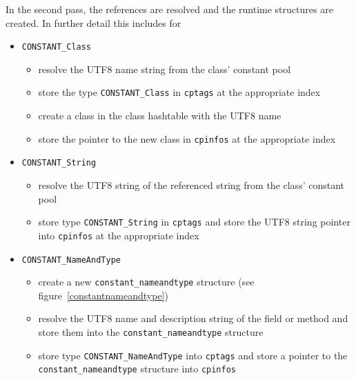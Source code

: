 In the second pass, the references are resolved and the runtime
structures are created. In further detail this includes for

\begin{itemize}

 \item \texttt{CONSTANT\_Class}

  \begin{itemize}

   \item resolve the UTF8 name string from the class' constant pool

   \item store the type \texttt{CONSTANT\_Class} in \texttt{cptags} at
   the appropriate index

   \item create a class in the class hashtable with the UTF8 name

   \item store the pointer to the new class in \texttt{cpinfos} at the
   appropriate index

  \end{itemize}

 \item \texttt{CONSTANT\_String}

  \begin{itemize}

   \item resolve the UTF8 string of the referenced string from the
   class' constant pool

   \item store type \texttt{CONSTANT\_String} in \texttt{cptags} and
   store the UTF8 string pointer into \texttt{cpinfos} at the
   appropriate index

  \end{itemize}

 \item \texttt{CONSTANT\_NameAndType}

  \begin{itemize}

   \item create a new \texttt{constant\_nameandtype} structure (see
   figure~\ref{constantnameandtype})

   \item resolve the UTF8 name and description string of the field or
   method and store them into the \texttt{constant\_nameandtype}
   structure

   \item store type \texttt{CONSTANT\_NameAndType} into
  \texttt{cptags} and store a pointer to the
  \texttt{constant\_nameandtype} structure into \texttt{cpinfos}


\end{itemize}
\end{itemize}
